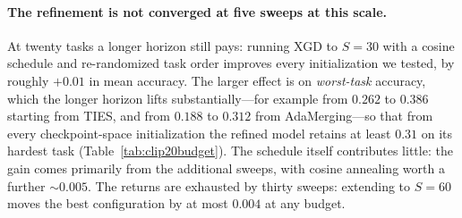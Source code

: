 \documentclass{article} %
\begin{document}
\iffalse
\paragraph{The refinement is not converged at five sweeps at this scale.}
At twenty tasks a longer horizon still pays: running XGD to $S=30$ with a cosine schedule and re-randomized task order improves every initialization we tested, by roughly $+0.01$ in mean accuracy. The larger effect is on \emph{worst-task} accuracy, which the longer horizon lifts substantially---for example from $0.262$ to $0.386$ starting from TIES, and from $0.188$ to $0.312$ from AdaMerging---so that from every checkpoint-space initialization the refined model retains at least $0.31$ on its hardest task (Table~\ref{tab:clip20budget}). The schedule itself contributes little: the gain comes primarily from the additional sweeps, with cosine annealing worth a further $\sim\!0.005$. The returns are exhausted by thirty sweeps: extending to $S=60$ moves the best configuration by at most $0.004$ at any budget.
\end{document}
